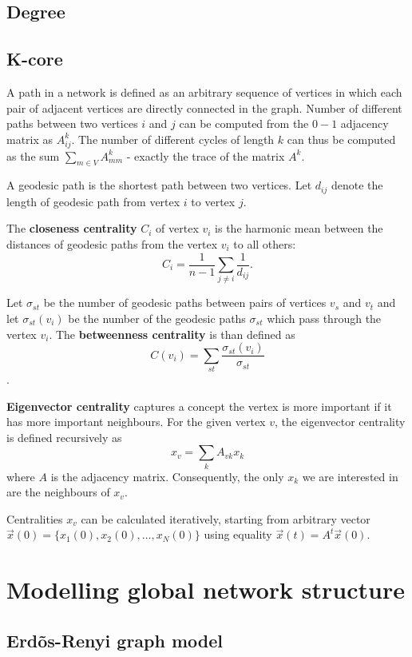\documentclass[times, utf8, diplomski]{fer}
\begin{document}
\subsection{Degree}
\subsection{K-core}



A path in a network is defined as an arbitrary sequence of vertices in which each pair of adjacent vertices are  directly connected in the graph. Number of different paths between two vertices $i$ and $j$ can be computed from the $0-1$ adjacency matrix as $A^k_{ij}$. The number of different cycles of length $k$ can thus be computed as the sum $\sum_{m \in V} A^k_{mm}$ - exactly the trace of the matrix $A^k$. 

A geodesic path is the shortest path between two vertices. Let $d_{ij}$ denote the length of geodesic path from vertex $i$ to vertex $j$. 



 The \textbf{closeness centrality} $C_i$ of vertex $v_i$ is the harmonic mean between the distances of geodesic paths from the vertex $v_i$ to all others:
$$ C_i = \frac{1}{n - 1} \sum_{j \neq i} \frac{1}{d_{ij}}. $$

Let $\sigma_{st}$ be the number of geodesic paths between pairs of vertices $v_s$ and $v_t$ and let $\sigma_{st}(v_i)$ be the number of the geodesic paths $\sigma_{st}$  which pass through the vertex $v_i$. The \textbf{betweenness centrality} is than defined as $$C(v_i) = \sum_{st} \frac{\sigma_{st}(v_i)}{\sigma_{st}} $$.

\textbf{Eigenvector centrality} \cite{bonacich1987power}  captures a concept the vertex is more important if it has more important neighbours. For the given vertex $v$, the eigenvector centrality is defined recursively as $$x_v = \sum_{k} A_{vk} x_k$$  where $A$ is the adjacency matrix. Consequently, the only $x_k$ we are interested in are the neighbours of $x_v$. 

Centralities $x_v$ can be calculated iteratively, starting from arbitrary vector $\vec x(0) = \{x_1(0), x_2(0), \ldots, x_N(0) \}$ using equality $\vec x(t) = A^t \vec x(0)$. 

\section{Modelling global network structure}
\subsection{Erd\~{o}s-Renyi graph model}
\end{document}
